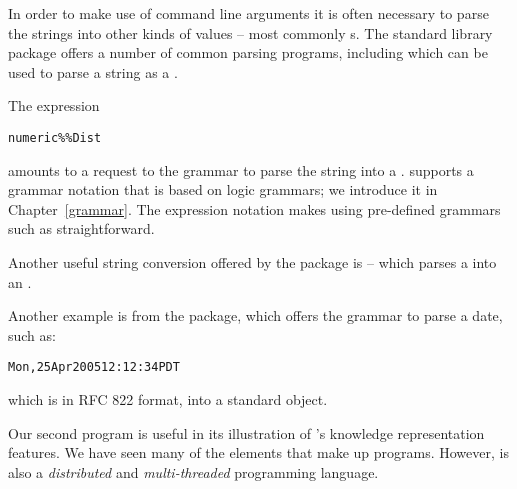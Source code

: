 In order to make use of command line arguments it is often necessary to parse the strings into other kinds of values -- most commonly s. The  standard library package offers a number of common parsing programs, including  which can be used to parse a string as a .

The expression
\begin{alltt}
numeric\%\%Dist
\end{alltt}
amounts to a request to the  grammar to parse the  string into a . \go supports a grammar notation that is based on logic grammars; we introduce it in Chapter~\vref{grammar}. The \q{\%\%} expression notation makes using pre-defined grammars such as  straightforward.

\begin{aside}
Another useful string conversion offered by the  package is  -- which parses a  into an . 

Another example is from the  package, which offers the  grammar to parse a date, such as:
\begin{alltt}
Mon, 25 Apr 2005 12:12:34 PDT
\end{alltt}
which is in RFC 822 format, into a standard \go {} object.
\end{aside}

Our second \go program is useful in its illustration of \go's knowledge representation features. We have seen many of the elements that make up \go programs. However, \go is also a \emph{distributed} and \emph{multi-threaded} programming language.
